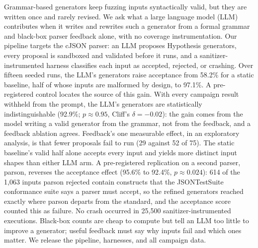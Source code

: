 Grammar-based generators keep fuzzing inputs syntactically valid, but they
are written once and rarely revised. We ask what a large language model
(LLM) contributes when it writes and rewrites such a generator from a
formal grammar and black-box parser feedback alone, with no coverage
instrumentation. Our pipeline targets the cJSON parser: an LLM proposes
Hypothesis generators, every proposal is sandboxed and validated before it
runs, and a sanitizer-instrumented harness classifies each input as
accepted, rejected, or crashing. Over fifteen seeded runs, the LLM's
generators raise acceptance from 58.2\% for a static baseline, half of
whose inputs are malformed by design, to 97.1\%. A pre-registered control
locates the source of this gain. With every campaign result withheld from
the prompt, the LLM's generators are statistically indistinguishable
(92.9\%; $p \approx 0.95$, Cliff's $\delta = -0.02$): the gain comes from
the model writing a valid generator from the grammar, not from the
feedback, and a feedback ablation agrees. Feedback's one measurable effect,
in an exploratory analysis, is that fewer proposals fail to run (29 against
52 of 75). The static baseline's valid half alone accepts every input and
yields more distinct input shapes than either LLM arm. A pre-registered
replication on a second parser, parson, reverses the acceptance effect
(95.6\% to 92.4\%, $p \approx 0.024$): 614 of the 1{,}063 inputs parson
rejected contain constructs that the JSONTestSuite conformance suite says
a parser must accept, so the refined generators reached exactly where
parson departs from the standard, and the acceptance score counted this as
failure. No crash occurred in 25{,}500 sanitizer-instrumented executions.
Black-box counts are cheap to compute but tell an LLM too little to improve
a generator; useful feedback must say why inputs fail and which ones
matter. We release the pipeline, harnesses, and all campaign data.
